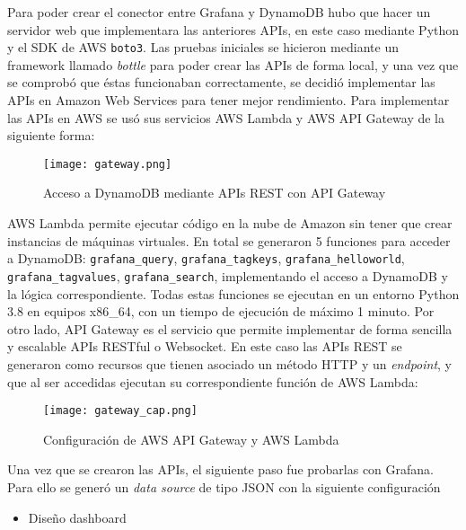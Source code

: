Para poder crear el conector entre Grafana y DynamoDB hubo que hacer un servidor web que implementara las anteriores APIs, en este caso mediante Python y el SDK de AWS \texttt{boto3}. Las pruebas iniciales se hicieron mediante un framework llamado \textit{bottle} para poder crear las APIs de forma local, y una vez que se comprobó que éstas funcionaban correctamente, se decidió implementar las APIs en Amazon Web Services para tener mejor rendimiento. Para implementar las APIs en AWS se usó sus servicios AWS Lambda y AWS API Gateway de la siguiente forma:

\begin{figure}[H]
    \centering
    \texttt{[image: gateway.png]}
    \caption{Acceso a DynamoDB mediante APIs REST con API Gateway}
    \label{fig:gateway_schema}
\end{figure}

AWS Lambda permite ejecutar código en la nube de Amazon sin tener que crear instancias de máquinas virtuales. En total se generaron 5 funciones para acceder a DynamoDB: \texttt{grafana\_query}, \texttt{grafana\_tagkeys}, \texttt{grafana\_helloworld}, \texttt{grafana\_tagvalues}, \texttt{grafana\_search}, implementando el acceso a DynamoDB y la lógica correspondiente. Todas estas funciones se ejecutan en un entorno Python 3.8 en equipos x86\_64, con un tiempo de ejecución de máximo 1 minuto. Por otro lado, API Gateway es el servicio que permite implementar de forma sencilla y escalable APIs RESTful o Websocket. En este caso las APIs REST se generaron como recursos que tienen asociado un método HTTP y un \textit{endpoint}, y que al ser accedidas ejecutan su correspondiente función de AWS Lambda:

\begin{figure}[H]
    \hspace*{-1cm}
    \centering
    \texttt{[image: gateway\_cap.png]}
    \caption{Configuración de AWS API Gateway y AWS Lambda}
    \label{fig:gateway_cap}
\end{figure}

Una vez que se crearon las APIs, el siguiente paso fue probarlas con Grafana. Para ello se generó un \textit{data source} de tipo JSON con la siguiente configuración

\begin{itemize}
    \item Diseño dashboard
\end{itemize}
